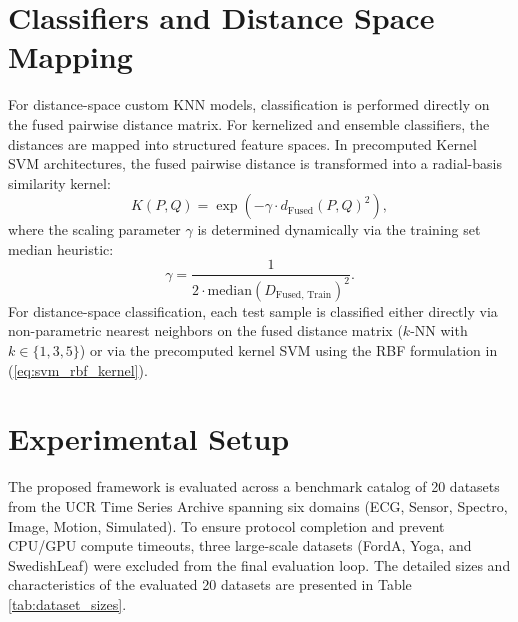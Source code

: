 \documentclass[conference]{IEEEtran}
\begin{document}
\section{Classifiers and Distance Space Mapping}

For distance-space custom KNN models, classification is performed directly on the fused pairwise distance matrix. For kernelized and ensemble classifiers, the distances are mapped into structured feature spaces. In precomputed Kernel SVM architectures, the fused pairwise distance is transformed into a radial-basis similarity kernel:
\begin{equation}
K(P, Q) = \exp\left( -\gamma \cdot d_{\text{Fused}}(P, Q)^2 \right),
\label{eq:kernel_svm}
\end{equation}
where the scaling parameter $\gamma$ is determined dynamically via the training set median heuristic:
\begin{equation}
\gamma = \frac{1}{2 \cdot \text{median}(D_{\text{Fused, Train}})^2}.
\label{eq:gamma_median}
\end{equation}
For distance-space classification, each test sample is classified either directly via non-parametric nearest neighbors on the fused distance matrix ($k$-NN with $k \in \{1, 3, 5\}$) or via the precomputed kernel SVM using the RBF formulation in (\ref{eq:svm_rbf_kernel}).

\section{Experimental Setup}

The proposed framework is evaluated across a benchmark catalog of 20 datasets from the UCR Time Series Archive spanning six domains (ECG, Sensor, Spectro, Image, Motion, Simulated). To ensure protocol completion and prevent CPU/GPU compute timeouts, three large-scale datasets (FordA, Yoga, and SwedishLeaf) were excluded from the final evaluation loop. The detailed sizes and characteristics of the evaluated 20 datasets are presented in Table \ref{tab:dataset_sizes}.
\end{document}

